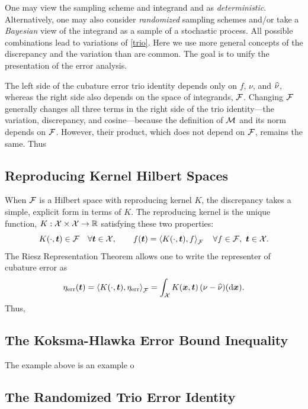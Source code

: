 \documentclass[graybox,footinfo]{svmult}
\begin{document}
One may view the sampling scheme and integrand and as \emph{deterministic}.  
Alternatively, one may also consider \emph{randomized} sampling schemes and/or take a 
\emph{Bayesian} view of the integrand as a sample of a stochastic process.  All possible 
combinations lead to variations of \eqref{trio}.  Here we use more general concepts of 
the discrepancy and the variation than are common.  The goal is to unify the 
presentation of the error analysis.




The left side of the cubature error trio identity depends only on $f$, $\nu$, and $\hnu$, whereas the right side also depends on the space of integrands, $\cf$.  Changing $\cf$ generally changes all three terms in the right side of the trio identity---the variation, discrepancy, and cosine---because the definition of $\cm$ and its norm depends on $\cf$.  However, their product, which does not depend on $\cf$, remains the same.  Thus

\subsection{Reproducing Kernel Hilbert Spaces}
When $\cf$ is a Hilbert space with reproducing kernel $K$, the discrepancy takes a simple, explicit form in terms of $K$.  The reproducing kernel is the unique function, $K: \cx \times \cx \to \R$ satisfying these two properties:
\begin{equation}
K(\cdot,\bst) \in \cf \quad \forall \bst \in \cx, \qquad f(\bst) = \ip[\cf]{K(\cdot,\bst)}{f} \quad \forall f \in \cf, \ \bst \in \cx.
\end{equation}
The Riesz Representation Theorem allows one to write the representer of cubature error as 
\begin{equation}
\eta_{\err}(\bst) = \ip[\cf]{K(\cdot,\bst)}{\eta_{\err}} = \int_{\cx} K(\bsx,\bst) \, (\nu - \hnu)(\D\bsx).
\end{equation}
Thus, 

\subsection{The Koksma-Hlawka Error Bound Inequality}
The example above is an example o

\subsection{The Randomized Trio Error Identity}
\end{document}
